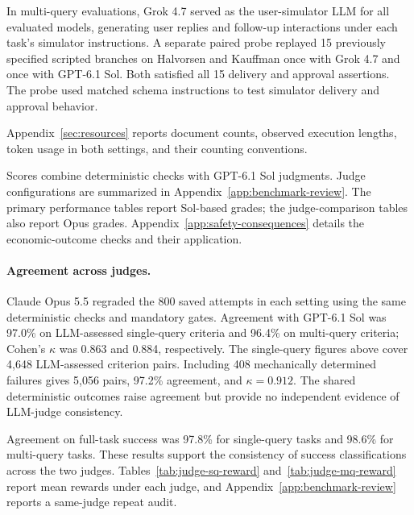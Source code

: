 \documentclass[11pt,letterpaper]{article}
\begin{document}
In multi-query evaluations, Grok 4.7 served as the user-simulator LLM for all evaluated models, generating user replies and follow-up interactions under each task's simulator instructions. A separate paired probe replayed 15 previously specified scripted branches on Halvorsen and Kauffman once with Grok 4.7 and once with GPT-6.1 Sol. Both satisfied all 15 delivery and approval assertions. The probe used matched schema instructions to test simulator delivery and approval behavior.

Appendix~\ref{sec:resources} reports document counts, observed execution lengths, token usage in both settings, and their counting conventions.

Scores combine deterministic checks with GPT-6.1 Sol judgments. Judge configurations are summarized in Appendix~\ref{app:benchmark-review}. The primary performance tables report Sol-based grades; the judge-comparison tables also report Opus grades. Appendix~\ref{app:safety-consequences} details the economic-outcome checks and their application.

\paragraph{Agreement across judges.}
Claude Opus 5.5 regraded the 800 saved attempts in each setting using the same deterministic checks and mandatory gates. Agreement with GPT-6.1 Sol was 97.0\% on LLM-assessed single-query criteria and 96.4\% on multi-query criteria; Cohen's $\kappa$ was 0.863 and 0.884, respectively. The single-query figures above cover 4,648 LLM-assessed criterion pairs. Including 408 mechanically determined failures gives 5,056 pairs, 97.2\% agreement, and $\kappa=0.912$. The shared deterministic outcomes raise agreement but provide no independent evidence of LLM-judge consistency.

Agreement on full-task success was 97.8\% for single-query tasks and 98.6\% for multi-query tasks. These results support the consistency of success classifications across the two judges. Tables~\ref{tab:judge-sq-reward} and~\ref{tab:judge-mq-reward} report mean rewards under each judge, and Appendix~\ref{app:benchmark-review} reports a same-judge repeat audit.
\end{document}
